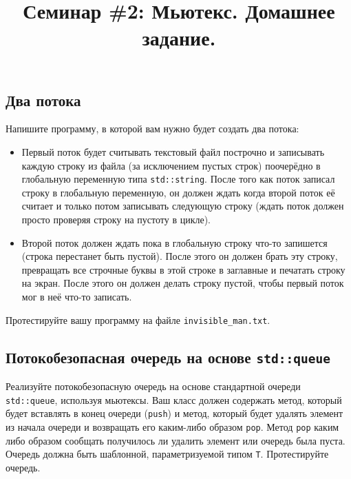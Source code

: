 \documentclass{article}
\begin{document}
\title{Семинар \#2: Мьютекс. Домашнее задание.\vspace{-5ex}}\date{}\maketitle
\subsection{Два потока}
Напишите программу, в которой вам нужно будет создать два потока:

\begin{itemize}
\item Первый поток будет считывать текстовый файл построчно и записывать каждую строку из файла (за исключением пустых строк) поочерёдно в глобальную переменную типа \texttt{std::string}. После того как поток записал строку в глобальную переменную, он должен ждать когда второй поток её считает и только потом записывать следующую строку (ждать поток должен просто проверяя строку на пустоту в цикле).

\item Второй поток должен ждать пока в глобальную строку что-то запишется (строка перестанет быть пустой). После этого он должен брать эту строку, превращать все строчные буквы в этой строке в заглавные и печатать строку на экран. После этого он должен делать строку пустой, чтобы первый поток мог в неё что-то записать.
\end{itemize}
Протестируйте вашу программу на файле \texttt{invisible\_man.txt}.


\subsection{Потокобезопасная очередь на основе \texttt{std::queue}}
Реализуйте потокобезопасную очередь на основе стандартной очереди \texttt{std::queue}, используя мьютексы.
Ваш класс должен содержать метод, который будет вставлять в конец очереди (\texttt{push}) и метод, который будет удалять элемент из начала очереди и возвращать его каким-либо образом \texttt{pop}. Метод \texttt{pop} каким либо образом сообщать получилось ли удалить элемент или очередь была пуста.\\
Очередь должна быть шаблонной, параметризуемой типом \texttt{T}. Протестируйте очередь.
\end{document}
